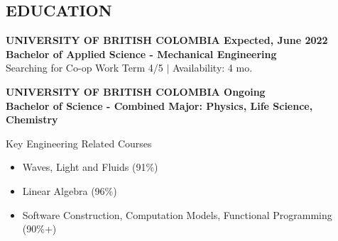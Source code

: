 \documentclass{article}
\begin{document}
\begin{textbox}
    \flushleft
    
    \subsection*{ EDUCATION}
    \hline
    \vspace{1em}
    \textbf{\textsc{UNIVERSITY OF BRITISH COLOMBIA} \hfill \textbf{Expected, June 2022} \\
    Bachelor of Applied Science - Mechanical Engineering} \\
    Searching for Co-op Work Term 4/5 $|$ Availability: 4 mo.
    \vspace{1em}
    
    \textbf{\textsc{UNIVERSITY OF BRITISH COLOMBIA} \hfill \textbf{Ongoing} \\
    Bachelor of Science - Combined Major: Physics, Life Science, Chemistry} \\
    \vspace{0.3em}
    
    Key Engineering Related Courses
    \vspace{-0.5em}
    \begin{itemize}
       \setlength\itemsep{-0.25em}
           \item Waves, Light and Fluids (91\%)
           \item Linear Algebra (96\%)
           \item Software Construction, Computation Models, Functional Programming (90\%+)
       \end{itemize}
       
    
\end{textbox}
\end{document}
